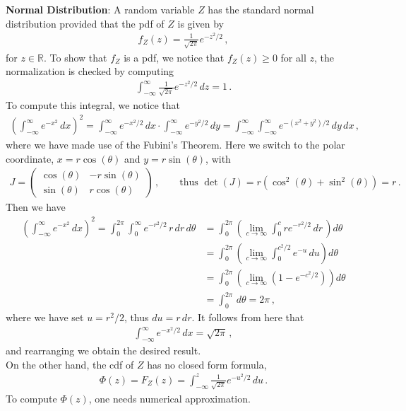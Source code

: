 \documentclass[11pt,oneside]{book}
\theoremstyle{newStyle}
\newcommand{\R}{\mathbb{R}}
\newcommand{\pmat}[1]{\begin{pmatrix} #1 \end{pmatrix}}
\begin{document}
\textbf{Normal Distribution}: A random variable $Z$ has the standard normal distribution provided that the pdf of $Z$ is given by
\begin{align*}
f_Z(z) = \frac{1}{\sqrt{2\pi}}e^{-z^2/2}\,,
\end{align*}
for $z \in \R$. To show that $f_Z$ is a pdf, we notice that $f_Z(z) \geq 0$ for all $z$, the normalization is checked by computing
\begin{align*}
\int_{-\infty}^\infty \frac{1}{\sqrt{2\pi}} e^{-z^2/2}\, dz = 1\,.
\end{align*}
To compute this integral, we notice that
\begin{align*}
\left( \int_{-\infty}^\infty e^{-x^2}\, dx\right)^2 = \int_{-\infty}^\infty e^{-x^2/2}\, dx \cdot \int_{-\infty}^\infty e^{-y^2/2}\, dy = \int_{-\infty}^\infty\int_{-\infty}^\infty e^{-(x^2+y^2)/2}\, dy\, dx\,,
\end{align*}
where we have made use of the Fubini's Theorem. Here we switch to the polar coordinate, $x = r\cos(\theta)$ and $y = r\sin(\theta)$, with 
\begin{align*}
J = \pmat{\cos(\theta) & -r\sin(\theta) \\ \sin(\theta) & r\cos(\theta)}\,,\qquad
\text{thus }\det(J) = r(\cos^2(\theta) + \sin^2(\theta) ) = r\,.
\end{align*}
Then we have
\begin{align*}
\left( \int_{-\infty}^\infty e^{-x^2}\, dx\right)^2  = \int_0^{2\pi} \int_0^{\infty}e^{-r^2/2}\, r\, dr\, d\theta &= \int_{0}^{2\pi} \left(\lim_{c\to \infty}\int_0^c re^{-r^2/2}\, dr\,\right) d\theta\\
&= \int_{0}^{2\pi} \left(\lim_{c\to \infty}\int_0^{c^2/2}e^{-u}\, du \right)  d\theta\\
&= \int_{0}^{2\pi} \left(\lim_{c\to \infty}\left( 1- e^{-c^2/2}\right) \right)  d\theta\\
&= \int_0^{2\pi}\, d\theta = 2\pi\,,
\end{align*}
where we have set $u = r^2/2$, thus $du = r\, dr$. It follows from here that
\begin{align*}
\int_{-\infty}^\infty e^{-x^2/2}\, dx = \sqrt{2\pi}\,,
\end{align*}
and rearranging we obtain the desired result. \\

On the other hand, the cdf of $Z$ has no closed form formula, 
\begin{align*}
\Phi(z) = F_Z(z) = \int_{-\infty}^z \frac{1}{\sqrt{2\pi}}e^{-u^2/2}\, du\,.
\end{align*}
To compute $\Phi(z)$, one needs numerical approximation.\\
\end{document}
